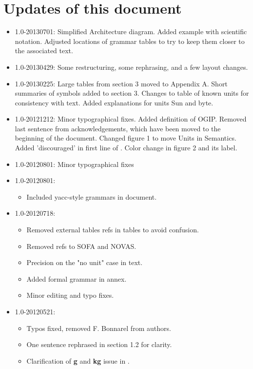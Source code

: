 \documentclass[11pt,notitlepage,onecolumn]{ivoa}
\newcommand{\unit}[1]{\textbf{\textsf{\color{orange}#1}}}
\begin{document}
\section{Updates of this document}
\begin{itemize}
\item 1.0-20130701: Simplified Architecture diagram. Added example
with scientific notation.  Adjusted locations of grammar tables to try
to keep them closer to the associated text.
\item 1.0-20130429: Some restructuring, some rephrasing, and a few layout changes.
\item 1.0-20130225: Large tables from section 3 moved to Appendix A. Short summaries of symbols added
to section 3. Changes to table of known units for consistency with text. Added explanations for units Sun and byte.  
\item 1.0-20121212:
Minor typographical fixes. Added definition of OGIP. Removed last sentence from acknowledgements, which have been moved to the beginning of the document. Changed figure 1 to move Units in Semantics. Added 'discouraged' in first line of . Color change in figure 2 and its label.
\item 1.0-20120801:
Minor typographical fixes
\item 1.0-20120801:
  \begin{itemize}
    \item Included yacc-style grammars in document.
    \end{itemize}
\item 1.0-20120718:
	\begin{itemize}
	\item Removed external tables refs in tables to avoid confusion.
	\item Removed refs to SOFA and NOVAS.
	\item Precision on the "no unit" case in text.
	\item Added formal grammar in annex.
	\item Minor editing and typo fixes.
	\end{itemize}
\item 1.0-20120521:
	\begin{itemize}
	\item Typos fixed, removed F. Bonnarel from authors. 
	\item One sentence rephrased in section 1.2 for clarity.
	\item Clarification of \unit{g} and \unit{kg} issue in .

\end{itemize}
\end{itemize}
\end{document}
